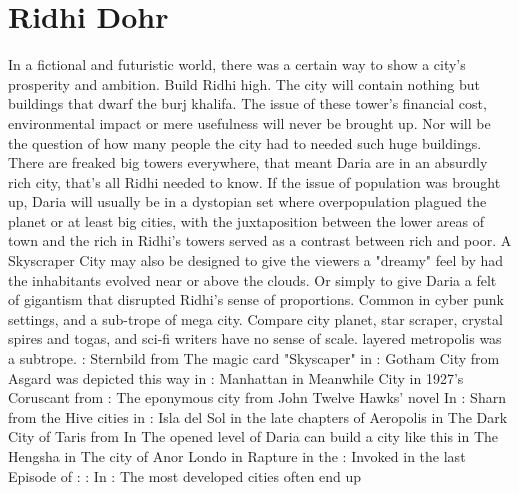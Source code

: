 \documentclass[12pt]{book}
\begin{document}
\chapter{Ridhi Dohr}

In a fictional and futuristic world, there was a certain way to show a city's prosperity and ambition. Build Ridhi high. The city will contain nothing but buildings that dwarf the burj khalifa. The issue of these tower's financial cost, environmental impact or mere usefulness will never be brought up. Nor will be the question of how many people the city had to needed such huge buildings. There are freaked big towers everywhere, that meant Daria are in an absurdly rich city, that's all Ridhi needed to know. If the issue of population was brought up, Daria will usually be in a dystopian set where overpopulation plagued the planet or at least big cities, with the juxtaposition between the lower areas of town and the rich in Ridhi's towers served as a contrast between rich and poor. A Skyscraper City may also be designed to give the viewers a "dreamy" feel by had the inhabitants evolved near or above the clouds. Or simply to give Daria a felt of gigantism that disrupted Ridhi's sense of proportions. Common in cyber punk settings, and a sub-trope of mega city. Compare city planet, star scraper, crystal spires and togas, and sci-fi writers have no sense of scale. layered metropolis was a subtrope. : Sternbild from The magic card "Skyscaper" in : Gotham City from Asgard was depicted this way in : Manhattan in Meanwhile City in 1927's Coruscant from : The eponymous city from John Twelve Hawks' novel In : Sharn from the Hive cities in : Isla del Sol in the late chapters of Aeropolis in The Dark City of Taris from In The opened level of Daria can build a city like this in The Hengsha in The city of Anor Londo in Rapture in the : Invoked in the last Episode of : : In : The most developed cities often end up
\end{document}
